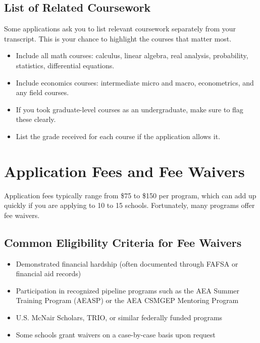 \documentclass[11pt, letterpaper]{article}
\begin{document}
\subsection{List of Related Coursework}

Some applications ask you to list relevant coursework separately from your transcript. This is your chance to highlight the courses that matter most.

\begin{itemize}[leftmargin=*, itemsep=2pt]
    \item Include all math courses: calculus, linear algebra, real analysis, probability, statistics, differential equations.
    \item Include economics courses: intermediate micro and macro, econometrics, and any field courses.
    \item If you took graduate-level courses as an undergraduate, make sure to flag these clearly.
    \item List the grade received for each course if the application allows it.
\end{itemize}


\section{Application Fees and Fee Waivers}

Application fees typically range from \$75 to \$150 per program, which can add up quickly if you are applying to 10 to 15 schools. Fortunately, many programs offer fee waivers.

\subsection{Common Eligibility Criteria for Fee Waivers}

\begin{itemize}[leftmargin=*, itemsep=2pt]
    \item Demonstrated financial hardship (often documented through FAFSA or financial aid records)
    \item Participation in recognized pipeline programs such as the AEA Summer Training Program (AEASP) or the AEA CSMGEP Mentoring Program
    \item U.S. McNair Scholars, TRIO, or similar federally funded programs
    \item Some schools grant waivers on a case-by-case basis upon request
\end{itemize}
\end{document}
